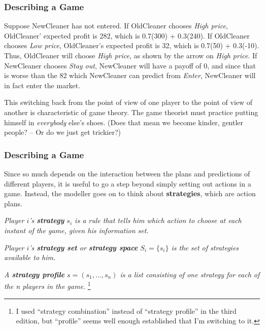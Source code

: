  \begin{frame}[fragile]\frametitle{Describing a Game}
  Suppose NewCleaner has not entered. If OldCleaner  chooses {\it High price},
OldCleaner' expected profit is  282, which is 0.7(300) + 0.3(240).   If
OldCleaner  chooses {\it  Low  price}, OldCleaner's expected profit is   32,
which is 0.7(50) + 0.3(-10).  Thus, OldCleaner will choose  {\it High price}, as
shown by the arrow on   {\it High price}.     If NewCleaner chooses {\it Stay
out}, NewCleaner will have a payoff of 0, and since that is worse than the 82
which NewCleaner can predict from {\it Enter}, NewCleaner will in fact enter the
market.

This switching back from the point of view of one player to the point of view of
another is characteristic of game theory.  The game theorist must practice
putting himself in {\it everybody} else's shoes.  (Does that mean we become
kinder, gentler people? -- Or do we just get trickier?)
\end{frame}


 \begin{frame}[fragile]\frametitle{Describing a Game}
Since so much depends on the interaction between the plans and predictions of
different players, it is useful to go a step beyond simply setting out actions
in a game.  Instead, the modeller goes on to think about {\bf strategies}, which
are action plans.

  {\it Player $i$'s {\bf strategy} $s_i$ is a rule that tells him which
action to choose at each instant of the game, given his information set.}

  {\it Player $i$'s {\bf strategy set} or {\bf strategy space} $S_i =
\{ s_i\}$ is the set of strategies available to him. }

  {\it A {\bf strategy profile} $s=(s_1,\ldots,s_n)$ is a list
consisting of one strategy for each of the {\rm n} players in the game.}
\footnote{ I used ``strategy combination'' instead of    ``strategy profile''
in the   third edition, but ``profile'' seems well enough established that I'm
switching to it.  }
\end{frame}


